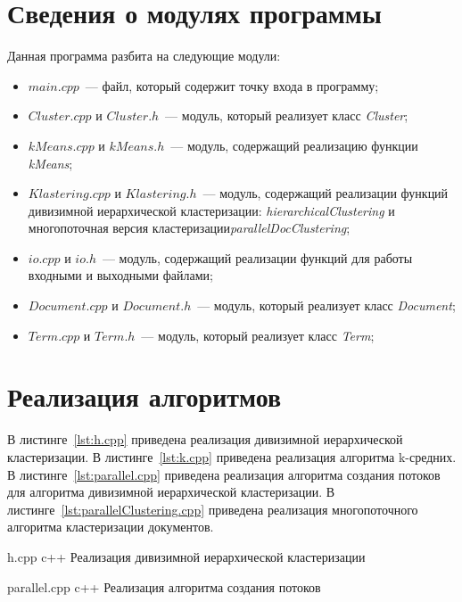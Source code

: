 \section{Сведения о модулях программы}
Данная программа разбита на следующие модули:
\begin{itemize}
	\item $main.cpp$~--- файл, который содержит точку входа в программу;
	\item $Cluster.cpp$ и $Cluster.h$~--- модуль, который реализует класс \textit{Cluster};
	\item $kMeans.cpp$ и $kMeans.h$~--- модуль, содержащий реализацию функции \textit{kMeans};
	\item $Klastering.cpp$ и $Klastering.h$~--- модуль, содержащий реализации функций дивизимной иерархической кластеризации: \textit{hierarchicalClustering} и многопоточная версия кластеризации\textit{parallelDocClustering};
	\item $io.cpp$ и $io.h$~--- модуль, содержащий реализации функций для работы входными и выходными файлами;
	\item $Document.cpp$ и $Document.h$~--- модуль, который реализует класс \textit{Document};
	\item $Term.cpp$ и $Term.h$~--- модуль, который реализует класс \textit{Term};
\end{itemize}



\section{Реализация алгоритмов}

В листинге~\ref{lst:h.cpp} приведена реализация дивизимной иерархической кластеризации.
В листинге~\ref{lst:k.cpp} приведена реализация алгоритма k-средних.
В листинге~\ref{lst:parallel.cpp} приведена реализация алгоритма создания потоков для алгоритма дивизимной иерархической кластеризации.
В листинге~\ref{lst:parallelClustering.cpp} приведена реализация многопоточного алгоритма кластеризации документов.
	
{h.cpp} %
{c++} %
{Реализация дивизимной иерархической кластеризации} %

\clearpage

{parallel.cpp} %
{c++} %
{Реализация алгоритма создания потоков} %


